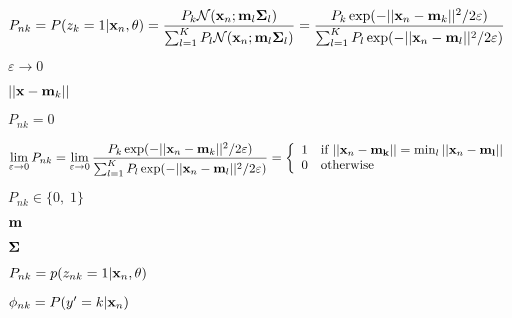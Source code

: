 \documentclass{article}
\def\lthtmlcheckvsize{\ifdim\ht\sizebox<\vsize 
  \ifdim\wd\sizebox<\hsize\expandafter\hfill\fi \expandafter\vfill
  \else\expandafter\vss\fi}%
\begin{document}
{\newpage\clearpage
{}%
$\displaystyle P_{nk}=P(z_k=1|{\bf x}_n,\theta)
=\frac{P_k{\cal N}({\bf x}_n;{\bf m}_l{\bf\Sigma}_l)}
{\sum_{l=1}^K P_l {\cal N}({\bf x}_n;{\bf m}_l{\bf\Sigma}_l)}
=\frac{P_k\exp(-||{\bf x}_n-{\bf m}_k||^2/2\varepsilon)}
{\sum_{l=1}^K P_l\exp(-||{\bf x}_n-{\bf m}_l||^2/2\varepsilon)}$%
\lthtmlindisplaymathZ
\lthtmlcheckvsize\clearpage}

{\newpage\clearpage
{}%
$ \varepsilon\rightarrow 0$%
\lthtmlindisplaymathZ
\lthtmlcheckvsize\clearpage}

{\newpage\clearpage
{}%
$ ||{\bf x}-{\bf m}_k||$%
\lthtmlindisplaymathZ
\lthtmlcheckvsize\clearpage}

{\newpage\clearpage
{}%
$ P_{nk}=0$%
\lthtmlindisplaymathZ
\lthtmlcheckvsize\clearpage}

{\newpage\clearpage
{}%
$\displaystyle \lim\limits_{\varepsilon\rightarrow 0} P_{nk}=\lim\limits_{\varepsilon\rightarrow 0}
\frac{P_k\exp(-||{\bf x}_n-{\bf m}_k||^2/2\varepsilon)}
{\sum_{l=1}^K P_l\exp(-||{\bf x}_n-{\bf m}_l||^2/2\varepsilon)}
=\left\{\begin{array}{ll}
1 & \mbox{if $||{\bf x}_n-{\bf m_k}||=\min_l ||{\bf x}_n-{\bf m_l}|$}|\\
0 & \mbox{otherwise}\end{array}\right.$%
\lthtmlindisplaymathZ
\lthtmlcheckvsize\clearpage}

{\newpage\clearpage
{}%
$ P_{nk}\in\{0,\;1\}$%
\lthtmlindisplaymathZ
\lthtmlcheckvsize\clearpage}

{\newpage\clearpage
{}%
$ {\bf m}$%
\lthtmlindisplaymathZ
\lthtmlcheckvsize\clearpage}

{\newpage\clearpage
{}%
$ {\bf\Sigma}$%
\lthtmlindisplaymathZ
\lthtmlcheckvsize\clearpage}

{\newpage\clearpage
{}%
$ P_{nk}=p(z_{nk}=1|{\bf x}_n,\theta)$%
\lthtmlindisplaymathZ
\lthtmlcheckvsize\clearpage}

{\newpage\clearpage
{}%
$ \phi_{nk}=P(y'=k|{\bf x}_n)$%
\lthtmlindisplaymathZ
\lthtmlcheckvsize\clearpage}
\end{document}

